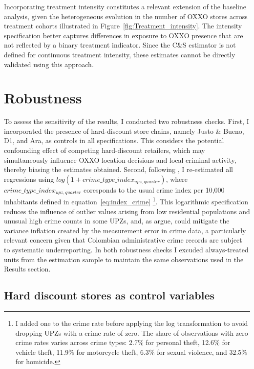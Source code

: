\documentclass[12pt]{article}
\begin{document}
Incorporating treatment intensity constitutes a relevant extension of the baseline analysis, given the heterogeneous evolution in the number of OXXO stores across treatment cohorts illustrated in Figure~\ref{fig:Treatment_intensity}. The intensity specification better captures differences in exposure to OXXO presence that are not reflected by a binary treatment indicator. Since the C\&S estimator is not defined for continuous treatment intensity, these estimates cannot be directly validated using this approach.

\section{Robustness}
\label{sec:Robustness}

To assess the sensitivity of the results, I conducted two robustness checks. First, I incorporated the presence of hard-discount store chains, namely Justo \& Bueno, D1, and Ara, as controls in all specifications. This considers the potential confounding effect of competing hard-discount retailers, which may simultaneously influence OXXO location decisions and local criminal activity, thereby biasing the estimates obtained. Second, following \textcite{ChalfinMcCrary2018, RaphaelWinterEbmer2001}, I re-estimated all regressions using  $log( 1 + crime\_type\_index_{upz,quarter} )$, where $crime\_type\_index_{upz,quarter}$ coresponds to the usual crime index per 10,000 inhabitants defined in equation~\ref{eq:index_crime} \footnote{I added one to the crime rate before applying the log transformation to avoid dropping UPZs with a crime rate of zero. The share of observations with zero crime rates varies across crime types: 2.7\% for personal theft, 12.6\% for vehicle theft, 11.9\% for motorcycle theft, 6.3\% for sexual violence, and 32.5\% for homicide.}. This logarithmic specification reduces the influence of outlier values arising from low residential populations and unusual high crime counts in some UPZs, and, as \textcite{pinasanchez2022impact} argue, could mitigate the variance inflation created by the measurement error in crime data, a particularly relevant concern given that Colombian administrative crime records are subject to systematic underreporting. In both robustness checks I excuded always-treated units from the estimation sample to maintain the same observations used in the Results section.

\subsection{Hard discount stores as control variables}
\end{document}
